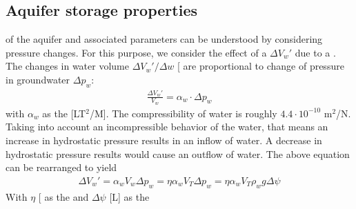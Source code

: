 \documentclass[letterpaper,10pt,english]{sphinxmanual}
\begin{document}
\subsection{Aquifer storage properties}
\label{\detokenize{contents/flow/lecture_03/13_gw_storage:aquifer-storage-properties}}
 of the aquifer and associated parameters can be understood by considering pressure changes. For this purpose, we consider the effect of a  \(\Delta V_w'\) due to a . The  changes in water volume \(\Delta V_w'/\Delta w\) {[}\sphinxhyphen{}{]} are proportional to change of pressure in groundwater \(\Delta p_w\):
\begin{equation*}
\begin{split}
\frac{\Delta V_w'}{V_w} = \alpha_w \cdot \Delta p_w
\end{split}
\end{equation*}
with \(\alpha_w\) as the  {[}LT\(^2\)/M{]}. The compressibility of water is roughly \(4.4 \cdot 10^{-10}\) m\(^2\)/N. Taking into account an incompressible behavior of the water, that means an increase in hydrostatic pressure results in an inflow of water. A decrease in hydrostatic pressure results would cause an outflow of water. The above equation can be rearranged to yield
\begin{equation*}
\begin{split}
\Delta V_w' = \alpha_w V_w \Delta p_w = \eta \alpha_w V_T \Delta p_w = \eta \alpha_w V_T \rho_w g \Delta \psi
\end{split}
\end{equation*}
With \(\eta\) {[}\sphinxhyphen{}{]} as the  and \(\Delta \psi\) {[}L{]} as the 
\end{document}
